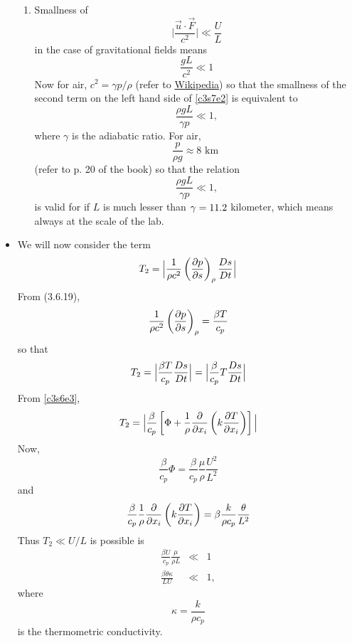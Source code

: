 \begin{itemize}
\begin{enumerate}
\item Smallness of
\[
\Big|\frac{\vec{u}\cdot\vec{F}}{c^2}\Big| \ll \frac{U}{L}
\]
in the case of gravitational fields means
\[
\frac{gL}{c^2} \ll 1
\]
Now for air, $c^2 = \gamma p/\rho$ (refer to \href{https://en.wikipedia.org/wiki/Speed_of_sound#Speed_of_sound_in_ideal_gases_and_air}{Wikipedia}) so that the smallness of the second 
term on the left hand side of \eqref{c3s7e2} is equivalent to
\[
\frac{\rho g L}{\gamma p} \ll 1,
\]
where $\gamma$ is the adiabatic ratio. For air, 
\[
\frac{p}{\rho g} \approx 8 \text{ km }
\]
(refer to p. 20 of the book) so that the relation
\[
\frac{\rho g L}{\gamma p} \ll 1,
\]
is valid for if $L$ is much lesser than $\gamma \time 8 = 11.2$ kilometer, which means always at the scale of the lab.
\end{enumerate}

\item We will now consider the term
\[
T_2 = \Big|\frac{1}{\rho c^2}\left(\frac{\partial{p}}{\partial{s}}\right)_\rho\frac{D{s}}{Dt}\Big| 
\]
From (3.6.19),
\[
\frac{1}{\rho c^2}\left(\frac{\partial{p}}{\partial{s}}\right)_\rho = \frac{\beta T}{c_p}
\]
so that 
\[
T_2 = \Big|\frac{\beta T}{c_p}\frac{D{s}}{Dt}\Big| = \Big|\frac{\beta}{c_p}T\frac{D{s}}{Dt}\Big|
\]
From \eqref{c3s6e3},
\[
T_2 = \Big|\frac{\beta}{c_p}\left[\Phi + \frac{1}{\rho}\frac{\partial}{\partial x_i}\left(k\frac{\partial{T}}{\partial{x_i}}\right)\right]\Big|
\]
Now,
\[
\frac{\beta}{c_p}\Phi = \frac{\beta}{c_p}\frac{\mu}{\rho}\frac{U^2}{L^2}
\]
and
\[
\frac{\beta}{c_p}\frac{1}{\rho}\frac{\partial}{\partial x_i}\left(k\frac{\partial{T}}{\partial{x_i}}\right) = \beta\frac{k}{\rho c_p}\frac{\theta}{L^2}
\]
Thus $T_2 \ll U/L$ is possible is
\begin{eqnarray}
\frac{\beta U}{c_p}\frac{\mu}{\rho L} &\ll& 1 \label{c3s7e7} \\
\frac{\beta\theta\kappa}{LU} &\ll& 1 \label{c3s7e8},
\end{eqnarray}
where
\[
\kappa = \frac{k}{\rho c_p}
\]
is the thermometric conductivity.
\end{itemize}
